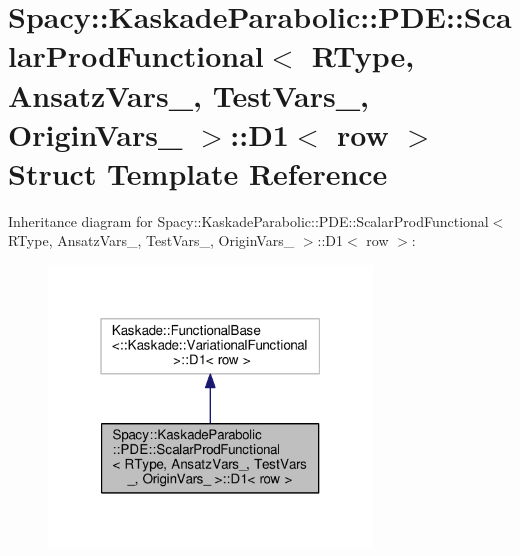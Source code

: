 \hypertarget{structSpacy_1_1KaskadeParabolic_1_1PDE_1_1ScalarProdFunctional_1_1D1}{\section{Spacy\-:\-:Kaskade\-Parabolic\-:\-:P\-D\-E\-:\-:Scalar\-Prod\-Functional$<$ R\-Type, Ansatz\-Vars\-\_\-, Test\-Vars\-\_\-, Origin\-Vars\-\_\- $>$\-:\-:D1$<$ row $>$ Struct Template Reference}
\label{structSpacy_1_1KaskadeParabolic_1_1PDE_1_1ScalarProdFunctional_1_1D1}
}


Inheritance diagram for Spacy\-:\-:Kaskade\-Parabolic\-:\-:P\-D\-E\-:\-:Scalar\-Prod\-Functional$<$ R\-Type, Ansatz\-Vars\-\_\-, Test\-Vars\-\_\-, Origin\-Vars\-\_\- $>$\-:\-:D1$<$ row $>$\-:
\nopagebreak
\begin{figure}[H]
\begin{center}
\leavevmode
\includegraphics[width=244pt]{structSpacy_1_1KaskadeParabolic_1_1PDE_1_1ScalarProdFunctional_1_1D1__inherit__graph}
\end{center}
\end{figure}


